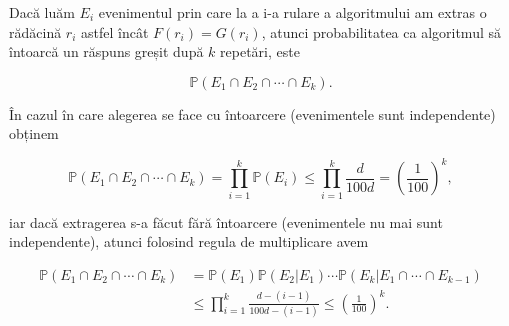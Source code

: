 \documentclass[]{article}
\begin{document}
Dacă luăm \(E_i\) evenimentul prin care la a i-a rulare a algoritmului
am extras o rădăcină \(r_i\) astfel încât \(F(r_i)=G(r_i)\), atunci
probabilitatea ca algoritmul să întoarcă un răspuns greșit după \(k\)
repetări, este

\[
  \mathbb{P}(E_1\cap E_2\cap \cdots\cap E_k).
\]

În cazul în care alegerea se face cu întoarcere (evenimentele sunt
independente) obținem

\[
  \mathbb{P}(E_1\cap E_2\cap \cdots\cap E_k) = \prod_{i=1}^{k}\mathbb{P}(E_i)\leq\prod_{i=1}^{k}\frac{d}{100d} = \left(\frac{1}{100}\right)^k,
\]

iar dacă extragerea s-a făcut fără întoarcere (evenimentele nu mai sunt
independente), atunci folosind regula de multiplicare avem

\begin{align*}
  \mathbb{P}(E_1\cap E_2\cap \cdots\cap E_k) &= \mathbb{P}(E_1)\mathbb{P}(E_2|E_1)\cdots\mathbb{P}(E_k|E_1\cap\cdots\cap E_{k-1})\\
                    &\leq \prod_{i=1}^{k}\frac{d - (i-1)}{100d - (i-1)} \leq \left(\frac{1}{100}\right)^k.
\end{align*}
\end{document}
